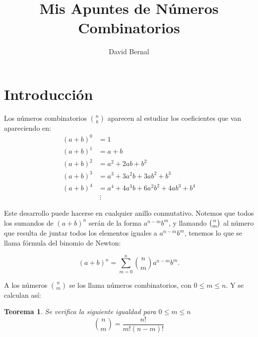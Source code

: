 \documentclass{article}
\theoremstyle{plain}
\newtheorem{teorema}{Teorema}[section]
\theoremstyle{definition}
\begin{document}
\title{Mis Apuntes de Números Combinatorios}
\author{David Bernal}
\maketitle

\section{Introducción}
Los números combinatorios $\binom{n}{k}$ aparecen al estudiar los coeficientes que van apareciendo en:
\begin{align*}
(a+b)^0 &= 1 \\
(a+b)^1 &= a + b \\
(a+b)^2 &= a^2 + 2ab + b^2 \\
(a+b)^3 &= a^3 + 3a^2b + 3ab^2 + b^3 \\
(a+b)^4 &= a^4 + 4a^3b + 6a^2b^2 + 4ab^3 + b^4 \\
&\ \vdots
\end{align*}

Este desarrollo puede hacerse en cualquier anillo conmutativo.
Notemos que todos los sumandos de $(a+b)^n$ serán de la forma $a^{n-m}b^m$, y llamando $\tbinom{n}{m}$
al número que resulta de juntar todos los elementos iguales a $a^{n-m}b^m$, tenemos lo que se llama fórmula
del binomio de Newton:

\begin{equation}
(a+b)^n = \displaystyle\sum_{m=0}^n \binom{n}{m}a^{n-m}b^m.
\end{equation}

A los números $\binom{n}{m}$ se los llama números combinatorios, con $ 0 \le m \le n$. Y se calculan así:
\begin{teorema}
    Se verifica la siguiente igualdad para $ 0 \le m \le n$
    \[
    \binom{n}{m} = \frac{n!}{m!(n-m)!}
    \]
\end{teorema}
\end{document}
